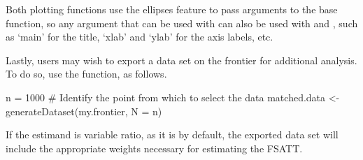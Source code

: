 \documentclass[nojss]{jss}
\begin{document}
Both plotting functions use the ellipses feature to pass arguments to
the base  function, so any argument that can be used with
 can also be used with  and
, such as `main' for the title, `xlab' and
`ylab' for the axis labels, etc. 

Lastly, users may wish to export a data set on the frontier for 
additional analysis. To do so, use the  
function, as follows. 

\begin{CodeChunk}
\begin{CodeInput}
n = 1000 # Identify the point from which to select the data
matched.data <- generateDataset(my.frontier, N = n)
\end{CodeInput}
\end{CodeChunk}

If the estimand is variable ratio, as it is by default, the
exported data set will include the appropriate weights necessary
for estimating the FSATT.


\end{document}
